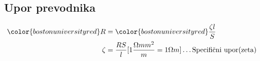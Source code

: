 {\color{indiagreen}\subsection{Upor prevodnika}}
\begin{align*}
	{\color{bostonuniversityred}R} &= {\color{bostonuniversityred}\frac{\zeta l }{S}}\\
	\zeta &= \frac{RS}{l}[1\frac{\Omega mm^2}{m} = 1\Omega m] \dots \text{Specifični upor(zeta)}\\
\end{align*}